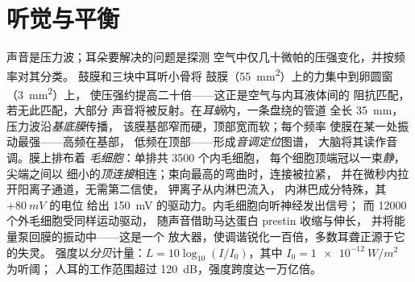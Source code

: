 \section{听觉与平衡}

\begin{definition}[耳蜗]\label{def:b3:sensory-systems:cochlea}
声音是压力波；耳朵要解决的问题是探测
空气中仅几十微帕的压强变化，并按频率对其分类。
鼓膜和三块中耳听小骨将
鼓膜（\qty{55}{mm^2}）上的力集中到卵圆窗（\qty{3}{mm^2}）上，
使压强约提高二十倍——这正是空气与内耳液体间的
阻抗匹配，若无此匹配，大部分
声音将被反射。在\emph{耳蜗}内，一条盘绕的管道
全长 \qty{35}{mm}，压力波沿\emph{基底膜}传播，
该膜基部窄而硬，顶部宽而软；每个频率
使膜在某一处振动最强——高频在基部，
低频在顶部——形成\emph{音调定位}图谱，
大脑将其读作音调。膜上排布着
\emph{毛细胞}：单排共 \num{3500} 个内毛细胞，
每个细胞顶端冠以一束\emph{静}，尖端之间以
细小的\emph{顶连接}相连；束向最高的弯曲时，连接被拉紧，
并在微秒内拉开阳离子通道，无需第二信使，
钾离子从内淋巴流入，
内淋巴成分特殊，其 $+\qty{80}{mV}$ 的电位
给出 \qty{150}{mV} 的驱动力。内毛细胞向听神经发出信号；
而 \num{12000} 个外毛细胞受同样运动驱动，
随声音借助马达蛋白 prestin 收缩与伸长，
并将能量泵回膜的振动中——这是一个
放大器，使调谐锐化一百倍，多数耳聋正源于它的失灵。
强度以\emph{分贝}计量：$L = 10\log_{10}
(I/I_{0})$，其中 $I_{0} = \qty{1e-12}{W/m^2}$ 为听阈；
人耳的工作范围超过 \qty{120}{dB}，强度跨度达一万亿倍。
\end{definition}

